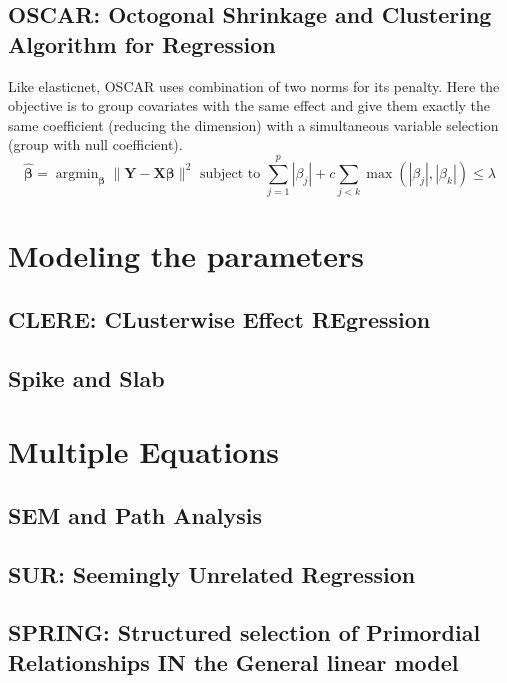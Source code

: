 \documentclass[11pt,a4paper]{report}
\begin{document}
		\subsection{OSCAR: Octogonal Shrinkage and Clustering Algorithm for Regression }
			Like elasticnet, \textsc{OSCAR} \cite{bondell2008simultaneous} uses combination of two norms for its penalty. Here the objective is to group covariates with the same effect and give them exactly the same coefficient (reducing the dimension) with a simultaneous variable selection (group with null coefficient).
			\begin{equation}
				\hat{\boldsymbol{\beta}}=\operatorname{argmin}_{\boldsymbol{\beta}} \parallel\boldsymbol{Y}-\boldsymbol{X}\boldsymbol{\beta} \parallel^2 \textrm{ subject to } \sum_{j=1}^p|\beta_j|+c\sum_{j<k}\operatorname{max}(|\beta_j|,|\beta_k|) \leq \lambda		
			\end{equation}						
			
	\section{Modeling the parameters}	
		\subsection{CLERE: CLusterwise Effect REgression}
			\cite{yengo2012variable}%
		\subsection{Spike and Slab}	
			\cite{ishwaran2005spike}%
	\section{Multiple Equations}
		\subsection{SEM and Path Analysis}
		\subsection{SUR: Seemingly Unrelated Regression}
			\cite{SURzellner}
		\subsection{SPRING: Structured selection of Primordial Relationships IN the General linear model}
			\cite{chiquetconf}			
			
\end{document}
